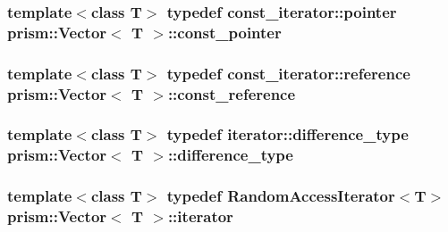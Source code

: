 \subsubsection[{\texorpdfstring{const\+\_\+pointer}{const_pointer}}]{\setlength{\rightskip}{0pt plus 5cm}template$<$class T$>$ typedef const\+\_\+iterator\+::pointer {\bf prism\+::\+Vector}$<$ T $>$\+::{\bf const\+\_\+pointer}}\hypertarget{classprism_1_1_vector_a0bf16322f83f0ad9103815a1cac16156}{}\label{classprism_1_1_vector_a0bf16322f83f0ad9103815a1cac16156}
\subsubsection[{\texorpdfstring{const\+\_\+reference}{const_reference}}]{\setlength{\rightskip}{0pt plus 5cm}template$<$class T$>$ typedef const\+\_\+iterator\+::reference {\bf prism\+::\+Vector}$<$ T $>$\+::{\bf const\+\_\+reference}}\hypertarget{classprism_1_1_vector_a75325487acaa0f63496c110e5a5632bb}{}\label{classprism_1_1_vector_a75325487acaa0f63496c110e5a5632bb}
\subsubsection[{\texorpdfstring{difference\+\_\+type}{difference_type}}]{\setlength{\rightskip}{0pt plus 5cm}template$<$class T$>$ typedef iterator\+::difference\+\_\+type {\bf prism\+::\+Vector}$<$ T $>$\+::{\bf difference\+\_\+type}}\hypertarget{classprism_1_1_vector_a5fe3b74bfb30d75aa74d4d896e6b7227}{}\label{classprism_1_1_vector_a5fe3b74bfb30d75aa74d4d896e6b7227}
\subsubsection[{\texorpdfstring{iterator}{iterator}}]{\setlength{\rightskip}{0pt plus 5cm}template$<$class T$>$ typedef Random\+Access\+Iterator$<$T$>$ {\bf prism\+::\+Vector}$<$ T $>$\+::{\bf iterator}}\hypertarget{classprism_1_1_vector_aa547779173a63f6f8c9b2887498d10eb}{}\label{classprism_1_1_vector_aa547779173a63f6f8c9b2887498d10eb}
